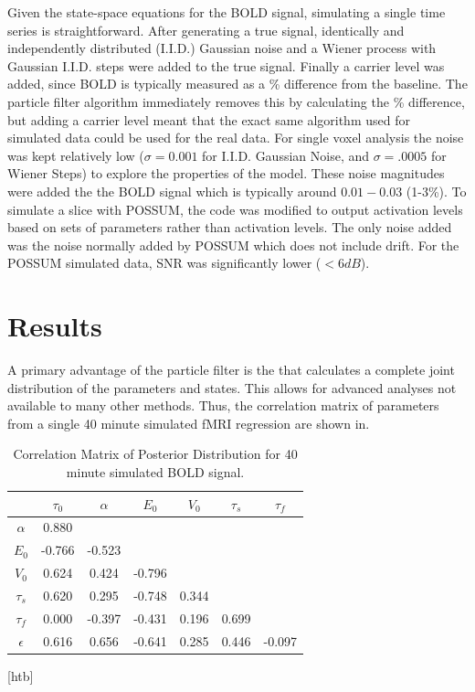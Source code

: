 \documentclass{article}
\begin{document}
Given the state-space equations for the \ac{BOLD} signal, simulating a single time
series is straightforward. After generating a true signal,
identically and independently distributed (I.I.D.) Gaussian noise and a Wiener
process with Gaussian I.I.D. steps were added to the true signal. Finally a
carrier level was added, since \ac{BOLD} is typically
measured as a \% difference from the baseline. The particle filter
algorithm immediately removes this by calculating the \% difference,
but adding a carrier level meant that the exact same algorithm used
for simulated data could be used for the real data. For single voxel
analysis the noise was kept relatively low ($\sigma = 0.001$  for
I.I.D. Gaussian Noise, and $\sigma = .0005$ for Wiener Steps) to
explore the properties of the model. These noise magnitudes were added
the the BOLD signal which is typically around $0.01-0.03$ (1-3\%). 
To simulate a slice with POSSUM, the code was modified to
output activation levels based on sets of parameters rather than
activation levels. The only noise added was the noise normally
added by POSSUM which does not include drift. 
For the POSSUM simulated data, SNR was significantly lower ($<6dB$).

\section{Results}
\label{sec:Results}
A primary advantage of the particle filter is the that calculates
a complete joint distribution of the parameters and states. This 
allows for advanced analyses not available to many other methods.
Thus, the correlation matrix of parameters from a single 40 minute
simulated fMRI regression are shown in. %
\begin{table}[t]
\ninept
  \centering
\begin{tabular}{|c | c  c  c  c  c  c  |}
\hline
  & $\tau_0$ & $\alpha$ & $E_0$    & $V_0$    & $\tau_s$ & $\tau_f$  \\
\hline
$\alpha$                      & 0.880& & & & & \\
\rowcolor[gray]{.8} $E_0$     & -0.766& -0.523& & & & \\
$V_0$                         & 0.624& 0.424& -0.796& & & \\
\rowcolor[gray]{.8} $\tau_s$  & 0.620& 0.295& -0.748& 0.344& & \\
$\tau_f$                      & 0.000& -0.397& -0.431& 0.196& 0.699& \\
\rowcolor[gray]{.8} $\epsilon$& 0.616& 0.656& -0.641& 0.285& 0.446& -0.097\\
\hline
\end{tabular}
  \caption{Correlation Matrix of Posterior Distribution for 40 minute simulated BOLD signal.}
\label{tab:long_corr}
\end{table}[htb]
\end{document}
